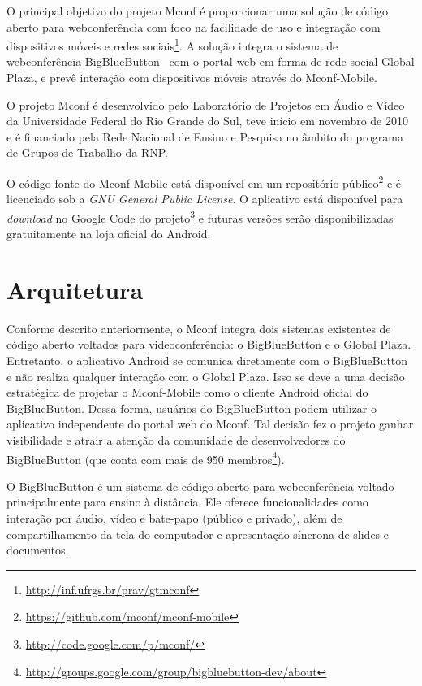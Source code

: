 \documentclass{acm_proc_article-sp}
\begin{document}
O principal objetivo do projeto Mconf é proporcionar uma solução de código aberto para webconferência com foco na facilidade de uso e integração com dispositivos móveis e redes sociais\footnote{\url{http://inf.ufrgs.br/prav/gtmconf}}. A solução integra o sistema de webconferência BigBlueButton~\cite{bigbluebutton} com o portal web em forma de rede social Global Plaza, e prevê interação com dispositivos móveis através do Mconf-Mobile.

O projeto Mconf é desenvolvido pelo Laboratório de Projetos em Áudio e Vídeo da Universidade Federal do Rio Grande do Sul, teve início em novembro de 2010 e é financiado pela Rede Nacional de Ensino e Pesquisa no âmbito do programa de Grupos de Trabalho da RNP.

O código-fonte do Mconf-Mobile está disponível em um repositório público\footnote{\url{https://github.com/mconf/mconf-mobile}} e é licenciado sob a \emph{GNU General Public License}. O aplicativo está disponível para \emph{download} no Google Code do projeto\footnote{\url{http://code.google.com/p/mconf/}} e futuras versões serão disponibilizadas gratuitamente na loja oficial do Android.


\section{Arquitetura}\label{sec:arquitetura}

Conforme descrito anteriormente, o Mconf integra dois sistemas existentes de código aberto voltados para videoconferência: o BigBlueButton e o Global Plaza. Entretanto, o aplicativo Android se comunica diretamente com o BigBlueButton e não realiza qualquer interação com o Global Plaza. Isso se deve a uma decisão estratégica de projetar o Mconf-Mobile como o cliente Android oficial do BigBlueButton. Dessa forma, usuários do BigBlueButton podem utilizar o aplicativo independente do portal web do Mconf. Tal decisão fez o projeto ganhar visibilidade e atrair a atenção da comunidade de desenvolvedores do BigBlueButton (que conta com mais de 950 membros\footnote{\url{http://groups.google.com/group/bigbluebutton-dev/about}}).

O BigBlueButton é um sistema de código aberto para webconferência voltado principalmente para ensino à distância. Ele oferece funcionalidades como interação por áudio, vídeo e bate-papo (público e privado), além de compartilhamento da tela do computador e apresentação síncrona de slides e documentos.
\end{document}
